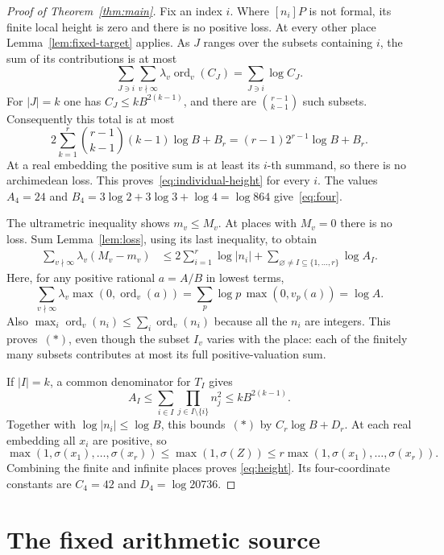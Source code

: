\documentclass[11pt,a4paper]{article}
\newcommand{\ord}{\operatorname{ord}}
\begin{document}
\begin{proof}[Proof of Theorem~\ref{thm:main}]
Fix an index $i$. Where $[n_i]P$ is not formal, its finite
local height is zero and there is no positive loss. At every
other place Lemma~\ref{lem:fixed-target} applies. As $J$
ranges over the subsets containing $i$, the sum of its
contributions is at most
\[
 \sum_{J\ni i}\sum_{v\nmid\infty}
                  \lambda_v\ord_v(C_J)
 =\sum_{J\ni i}\log C_J.
\]
For $|J|=k$ one has $C_J\le kB^{2(k-1)}$, and there are
$\binom{r-1}{k-1}$ such subsets. Consequently this total
is at most
\[
 2\sum_{k=1}^r\binom{r-1}{k-1}(k-1)\log B+B_r
 =(r-1)2^{r-1}\log B+B_r.
\]
At a real embedding the positive sum is at least its
$i$-th summand, so there is no archimedean loss.
This proves~\eqref{eq:individual-height} for every $i$.
The values $A_4=24$ and
$B_4=3\log2+3\log3+\log4=\log864$ give~\eqref{eq:four}.

The ultrametric inequality shows $m_v\le M_v$. At places
with $M_v=0$ there is no loss. Sum Lemma~\ref{lem:loss},
using its last inequality, to obtain
\begin{align*}
 \sum_{v\nmid\infty}\lambda_v(M_v-m_v)
 &\le2\sum_{i=1}^r\log|n_i|
    +\sum_{\varnothing\ne I\subseteq\{1,\ldots,r\}}
       \log A_I.                                      \tag{*}
\end{align*}
Here, for any positive rational $a=A/B$ in lowest terms,
\[
 \sum_{v\nmid\infty}\lambda_v\max(0,\ord_v(a))=
 \sum_p\log p\,\max(0,v_p(a))=\log A.
\]
Also $\max_i\ord_v(n_i)\le\sum_i\ord_v(n_i)$ because
all the $n_i$ are integers. This proves~$(*)$, even though
the subset $I_v$ varies with the place: each of the finitely
many subsets contributes at most its full positive-valuation
sum.

If $|I|=k$, a common denominator for $T_I$ gives
\[
 A_I\le\sum_{i\in I}\prod_{j\in I\setminus\{i\}}n_j^2
       \le kB^{2(k-1)}.
\]
Together with $\log|n_i|\le\log B$, this bounds~$(*)$
by $C_r\log B+D_r$. At each real embedding all $x_i$ are
positive, so
\[
 \max(1,\sigma(x_1),\ldots,\sigma(x_r))
 \le\max(1,\sigma(Z))
 \le r\max(1,\sigma(x_1),\ldots,\sigma(x_r)).
\]
Combining the finite and infinite places proves
\eqref{eq:height}. Its four-coordinate constants are
$C_4=42$ and $D_4=\log20736$.
\end{proof}

\section{The fixed arithmetic source}
\end{document}
